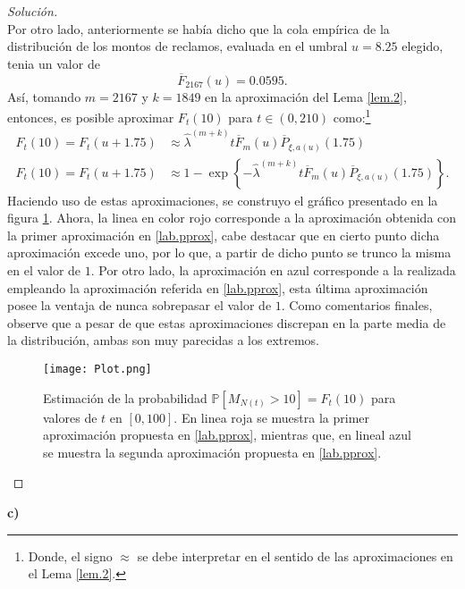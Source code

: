\documentclass[10.5pt,notitlepage]{article}
\newenvironment{solucion}
  {\begin{proof}[Solución]}
  {\end{proof}}
\newcommand{\PP}{\mathbb{P}}
\newcommand{\kis}[1]{\left\{ #1 \right\}}
\theoremstyle{plain}
\begin{document}
\begin{solucion}
\begin{equation}
\end{equation}
Por otro lado, anteriormente se había dicho que la cola empírica de la distribución de los montos de reclamos, evaluada en el umbral \(u = 8.25\) elegido, tenia un valor de
\[
\overline{F}_{2167}(u) = 0.0595.
\]
Así, tomando \(m = 2167\) y \(k = 1849\) en la aproximación del Lema \ref{lem.2}, entonces, es posible aproximar \(F_{t}(10)\) para \(t \in (0,210)\) como:\footnote{Donde, el signo \(\approx\) se debe interpretar en el sentido de las aproximaciones en el Lema \ref{lem.2}.}
\begin{align}
    F_{t}(10) = F_{t}(u + 1.75) &\approx  \hat{\lambda}^{(m+k)} t \overline{F}_{m}(u)\overline{P}_{\xi,a(u)}(1.75) \nonumber\\ 
    F_{t}(10) = F_{t}(u + 1.75) &\approx   1-\exp\kis{- \hat{\lambda}^{(m + k)} t \overline{F}_{m}(u)\overline{P}_{\xi,a(u)}(1.75)}. \label{lab.pprox}
\end{align}
Haciendo uso de estas aproximaciones, se construyo el gráfico presentado en la figura \ref{fig:8}. Ahora, la linea en color rojo corresponde a la aproximación obtenida con la primer aproximación en \eqref{lab.pprox}, cabe destacar que en cierto punto dicha aproximación excede uno, por lo que, a partir de dicho punto se trunco la misma en el valor de \(1\). Por otro lado, la aproximación en azul corresponde a la realizada empleando la aproximación referida en \ref{lab.pprox}, esta última aproximación posee la ventaja de nunca sobrepasar el valor de \(1\). Como comentarios finales, observe que a pesar de que estas aproximaciones discrepan en la parte media de la distribución, ambas son muy parecidas a los extremos. 

\begin{figure}[htb]
    \centering
    \texttt{[image: Plot.png]}
    \caption{Estimación de la probabilidad \(\PP[M_{N(t)} > 10] =F_{t}(10)\) para valores de \(t\) en \([0,100]\). En linea roja se muestra la primer aproximación propuesta en \eqref{lab.pprox}, mientras que, en lineal azul se muestra la segunda aproximación propuesta en \eqref{lab.pprox}.}
    \label{fig:8}
\end{figure}
\end{solucion}
\newpage
\textbf{c)}
\end{document}
